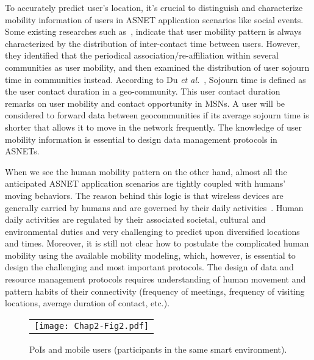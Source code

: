 To accurately predict user's location, it's crucial to distinguish and characterize mobility information of users in ASNET application scenarios like social events. Some existing researches such as~\cite{PHui2005}\cite{AChaintreau2007}\cite{TKaragiannis2010}, indicate that user mobility pattern is always characterized by the distribution of inter-contact time between users. However, they identified that the periodical association/re-affiliation within several communities as user mobility, and then examined the distribution of user sojourn time in communities instead. According to Du {\it et al.}~\cite{YDu2011}, Sojourn time is defined as the user contact duration in a geo-community. This user contact duration remarks on user mobility and contact opportunity in MSNs. A user will be considered to forward data between geocommunities if its average sojourn time is shorter that allows it to move in the network frequently. The knowledge of user mobility information is essential to design data management protocols in ASNETs.

When we see the human mobility pattern on the other hand, almost all the anticipated ASNET application scenarios are tightly coupled with humans' moving behaviors. The reason behind this logic is that wireless devices are generally carried by humans and are governed by their daily activities~\cite{DKotz2005}\cite{CGonzalez2008}\cite{CSong2010}. Human daily activities are regulated by their associated societal, cultural and environmental duties and very challenging to predict upon diversified locations and times. Moreover, it is still not clear how to postulate the complicated human mobility using the available mobility modeling, which, however, is essential to design the challenging and most important protocols. The design of data and resource management protocols requires understanding of human movement and pattern habits of their connectivity (frequency of meetings, frequency of visiting locations, average duration of contact, etc.).

\begin{figure}[b]
\begin{center}
  \begin{tabular}{c}
  \texttt{[image: Chap2-Fig2.pdf]}
  \end{tabular}
  \caption{PoIs and mobile users (participants in the same smart environment).}
\end{center}
\end{figure}

